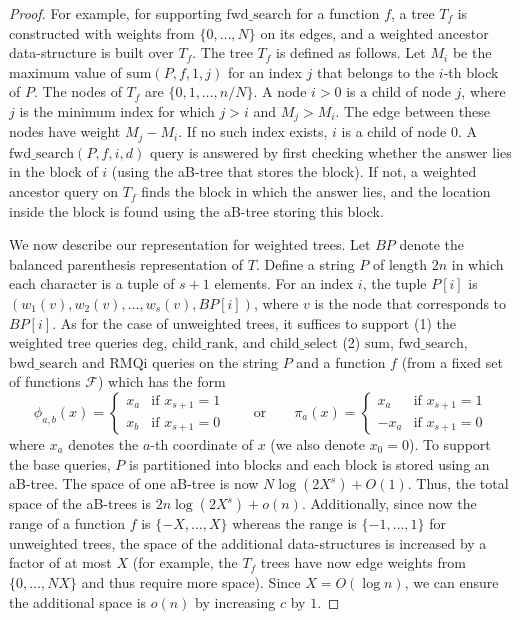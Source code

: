 \documentclass[12pt]{article}
\newcommand{\BP}{\mathit{BP}}
\newcommand{\Degb}{\mathrm{deg}}
\newcommand{\childrankb}{\mathrm{child\_rank}}
\newcommand{\childselectb}{\mathrm{child\_select}}
\newcommand{\idxzero}{0}
\newcommand{\Sumb}{\mathrm{sum}}
\newcommand{\fwdsearchb}{\mathrm{fwd\_search}}
\newcommand{\bwdsearchb}{\mathrm{bwd\_search}}
\newcommand{\RMQib}{\mathrm{RMQi}}
\newcommand{\Sum}[4]{\Sumb(#1,#2,#3,#4)}
\newcommand{\fwdsearch}[4]{\fwdsearchb(#1,#2,#3,#4)}
\newcommand{\range}[2]{\{#1,\ldots,#2\}}
\begin{document}
\begin{proof}
For example, for supporting $\fwdsearchb$ for a function $f$,
a tree $T_f$ is constructed with weights from $\range{0}{N}$ on its edges,
and a weighted ancestor data-structure is built over $T_f$.
The tree $T_f$ is defined as follows.
Let $M_i$ be the maximum value of $\Sum{P}{f}{1}{j}$ for an
index $j$ that belongs to the $i$-th block of $P$.
The nodes of $T_f$ are $\{0,1,\ldots,n/N\}$.
A node $i>0$ is a child of node $j$, where $j$ is the minimum index for which
$j>i$ and $M_j > M_i$. The edge between these nodes have weight
$M_j-M_i$.
If no such index exists, $i$ is a child of node $0$.
A $\fwdsearch{P}{f}{i}{d}$ query is answered by first checking whether
the answer lies in the block of $i$ (using the aB-tree that stores the block).
If not, a weighted ancestor query
on $T_f$ finds the block in which the answer lies, and the location
inside the block is found using the aB-tree storing this block.

We now describe our representation for weighted trees.
Let $\BP$ denote the balanced parenthesis representation of $T$.
Define a string $P$ of length $2n$ in which each
character is a tuple of $s+1$ elements.
For an index $i$, the tuple $P[i]$ is $(w_1(v),w_2(v),\ldots,w_s(v),\BP[i])$,
where $v$ is the node that corresponds to $\BP[i]$.
As for the case of unweighted trees, it suffices to support
(1) the weighted tree queries
$\Degb$, $\childrankb$, and $\childselectb$
(2) $\Sumb$, $\fwdsearchb$, $\bwdsearchb$ and $\RMQib$ queries on the
string $P$ and a function $f$ (from a fixed set of functions $\mathcal{F}$)
which has the form
\[
\phi_{a,b}(x) = \begin{cases}
x_a & \text{if $x_{s+1} = 1$}\\
x_b & \text{if $x_{s+1} = 0$}
\end{cases}
\qquad \text{or} \qquad
\pi_{a}(x) = \begin{cases}
x_a & \text{if $x_{s+1} = 1$}\\
-x_a & \text{if $x_{s+1} = 0$}
\end{cases}
\]
where $x_a$ denotes the $a$-th coordinate of $x$
(we also denote $x_{\idxzero} = 0$).
To support the base queries, $P$ is partitioned into blocks and each block
is stored using an aB-tree.
The space of one aB-tree is now $N\log(2X^s)+O(1)$.
Thus, the total space of the aB-trees is $2n\log(2X^s)+o(n)$.
Additionally, since now the range of a function $f$ is $\range{-X}{X}$
whereas the range is $\range{-1}{1}$ for unweighted trees,
the space of the additional data-structures is increased
by a factor of at most $X$
(for example, the $T_f$ trees have now edge weights from $\range{0}{NX}$
and thus require more space).
Since $X=O(\log n)$, we can ensure the additional space is $o(n)$
by increasing $c$ by $1$.
\end{proof}
\end{document}
